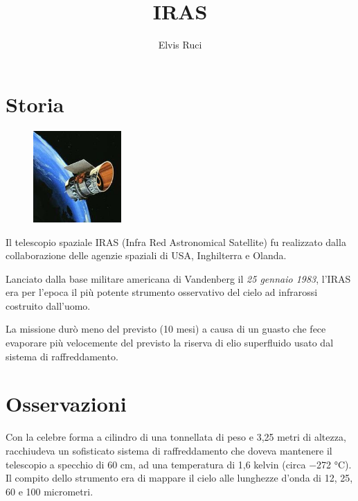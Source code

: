 \documentclass[12pt,a4paper]{article}
\begin{document}
\title{\vspace{-70pt}IRAS}
\author{Elvis Ruci}
\date{}
\maketitle
\pagestyle{empty}
\thispagestyle{empty}

\section*{Storia}
\label{storia}
\begin{figure}
  \vspace{-10pt}
  \begin{center}
    \includegraphics[width=0.30\textwidth]{satellite}
  \end{center}
  \vspace{-20pt}
\end{figure}
Il telescopio spaziale IRAS (Infra Red Astronomical Satellite) fu realizzato dalla collaborazione delle agenzie spaziali di USA, Inghilterra e Olanda.

Lanciato dalla base militare americana di Vandenberg il \emph{25 gennaio 1983}, l'IRAS era per l'epoca il più potente strumento osservativo del cielo ad infrarossi costruito dall'uomo. 

La missione durò meno del previsto (10 mesi) a causa di un guasto che fece evaporare più velocemente del previsto la riserva di elio superfluido usato dal sistema di raffreddamento. 

\section*{Osservazioni}
\label{osservazioni}

Con la celebre forma a cilindro di una tonnellata di peso e 3,25 metri di altezza, racchiudeva un sofisticato sistema di raffreddamento che doveva mantenere il telescopio a specchio di 60 cm, ad una temperatura di 1,6 kelvin (circa −272 °C). Il compito dello strumento era di mappare il cielo alle lunghezze d'onda di 12, 25, 60 e 100 micrometri.
\end{document}
